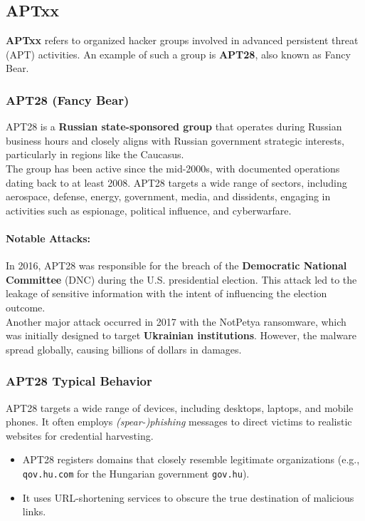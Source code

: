 \subsection{APTxx}

\textbf{APTxx} refers to organized hacker groups involved in advanced persistent threat (APT) activities. An example of such a group is \textbf{APT28}, also known as Fancy Bear.

\subsubsection{APT28 (Fancy Bear)}
APT28 is a \textbf{Russian state-sponsored group} that operates during Russian business hours and closely aligns with Russian government strategic interests, particularly in regions like the Caucasus. \\The group has been active since the mid-2000s, with documented operations dating back to at least 2008. APT28 targets a wide range of sectors, including aerospace, defense, energy, government, media, and dissidents, engaging in activities such as espionage, political influence, and cyberwarfare.

\paragraph{Notable Attacks:} In 2016, APT28 was responsible for the breach of the \textbf{Democratic National Committee} (DNC) during the U.S. presidential election. This attack led to the leakage of sensitive information with the intent of influencing the election outcome. \\Another major attack occurred in 2017 with the NotPetya ransomware, which was initially designed to target \textbf{Ukrainian institutions}. However, the malware spread globally, causing billions of dollars in damages.


\subsubsection{APT28 Typical Behavior}

APT28 targets a wide range of devices, including desktops, laptops, and mobile phones. It often employs \textit{(spear-)phishing} messages to direct victims to realistic websites for credential harvesting. 

\begin{itemize}[itemsep=0pt]
    \item APT28 registers domains that closely resemble legitimate organizations (e.g., \texttt{qov.hu.com} for the Hungarian government \texttt{gov.hu}).
    \item It uses URL-shortening services to obscure the true destination of malicious links.
\end{itemize}

